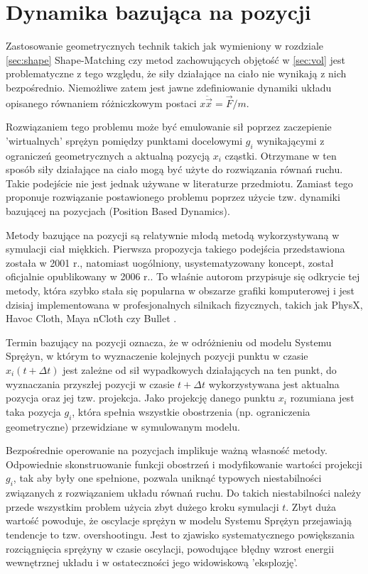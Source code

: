 \section{Dynamika bazująca na pozycji}

Zastosowanie geometrycznych technik takich jak wymieniony w rozdziale
\ref{sec:shape} Shape-Matching czy metod zachowujących objętość w \ref{sec:vol}
jest problematyczne z tego względu, że siły działające na ciało nie wynikają
z nich bezpośrednio. Niemożliwe zatem jest jawne zdefiniowanie dynamiki układu
opisanego równaniem różniczkowym postaci $x\ddot{\vec{x}} = \vec{F}/m$.

Rozwiązaniem tego problemu może być emulowanie sił poprzez zaczepienie
'wirtualnych' sprężyn pomiędzy punktami docelowymi $g_i$ wynikającymi z ograniczeń
geometrycznych a aktualną pozycją $x_i$ cząstki. Otrzymane w ten sposób
siły działające na ciało mogą być użyte do rozwiązania równań ruchu.
Takie podejście nie jest jednak używane w literaturze przedmiotu. Zamiast tego
\cite{pbdyn} proponuje rozwiązanie postawionego problemu poprzez użycie
tzw. dynamiki bazującej na pozycjach (Position Based Dynamics).

Metody bazujące na pozycji są relatywnie młodą metodą wykorzystywaną w symulacji
ciał miękkich. Pierwsza propozycja takiego podejścia przedstawiona została w
2001 r.\cite{jak}, natomiast uogólniony, usystematyzowany koncept, został oficjalnie
opublikowany w 2006 r.\cite{pbdyn}. To właśnie autorom \cite{pbdyn} przypisuje
się odkrycie tej metody, która szybko stała się popularna w obszarze grafiki
komputerowej i jest dzisiaj implementowana w profesjonalnych silnikach fizycznych,
takich jak PhysX, Havoc Cloth, Maya nCloth czy Bullet \cite{Liu:2013:FSM}.

Termin bazujący na pozycji oznacza, że w odróżnieniu od modelu Systemu Sprężyn,
	   w którym to wyznaczenie kolejnych pozycji punktu w czasie $x_i(t +
			   \Delta t)$ jest zależne od sił wypadkowych działających na ten
	   punkt, do wyznaczania przyszłej pozycji w czasie $t + \Delta t$
	   wykorzystywana jest aktualna pozycja oraz jej tzw. projekcja. Jako
	   projekcję danego punktu $x_i$ rozumiana jest taka pozycja $g_i$, która
	   spełnia wszystkie obostrzenia (np. ograniczenia geometryczne)
	przewidziane w symulowanym modelu.

Bezpośrednie operowanie na pozycjach implikuje ważną własność metody. Odpowiednie
skonstruowanie funkcji obostrzeń i modyfikowanie wartości projekcji $g_i$, tak
aby były one spełnione, pozwala uniknąć typowych niestabilności związanych z
rozwiązaniem układu równań ruchu. Do takich niestabilności należy przede
wszystkim problem użycia zbyt dużego kroku symulacji $t$. Zbyt
duża wartość powoduje, że oscylacje sprężyn w modelu Systemu Sprężyn przejawiają
tendencje to tzw. overshootingu. Jest to zjawisko systematycznego powiększania rozciągnięcia
sprężyny w czasie oscylacji, powodujące błędny wzrost energii wewnętrznej układu i w
ostateczności jego widowiskową 'eksplozję'.

